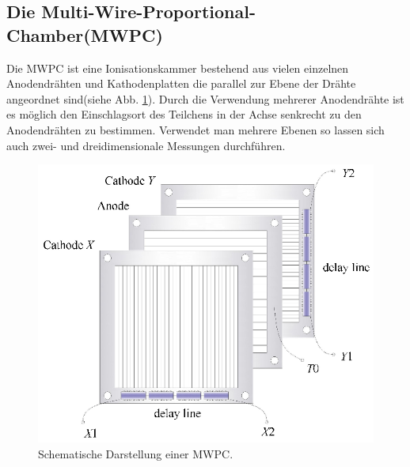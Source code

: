 \subsection{Die Multi-Wire-Proportional-Chamber(MWPC)}
Die MWPC ist eine Ionisationskammer bestehend aus vielen einzelnen Anodendrähten und Kathodenplatten die parallel zur Ebene der Drähte angeordnet sind(siehe Abb. \ref{fig:MWPC}). Durch die Verwendung mehrerer Anodendrähte ist es möglich den Einschlagsort des Teilchens in der Achse senkrecht zu den Anodendrähten zu bestimmen. Verwendet man mehrere Ebenen so lassen sich auch zwei- und dreidimensionale Messungen durchführen.
\begin{figure}
\centering
\includegraphics[]{./input/MWPC.eps}\caption{Schematische Darstellung einer MWPC\cite{Tang:2013daa}.}\label{fig:MWPC}
\end{figure}
